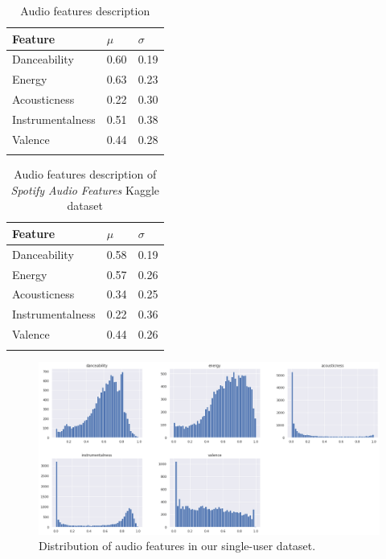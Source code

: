 \documentclass[sn-mathphys]{sn-jnl}%
\theoremstyle{thmstyleone}%
\theoremstyle{thmstyletwo}%
\theoremstyle{thmstylethree}%
\begin{document}
\begin{table}[h!]
      \begin{center}
      \begin{minipage}{\textwidth}
      \caption{Audio features description}\label{table:audio-features-stats}%
      \begin{tabular}{@{}lll@{}}
      \toprule
      Feature           & $\mu$ & $\sigma$ \\
      \midrule
      Danceability      & 0.60  & 0.19  \\
      Energy            & 0.63  & 0.23  \\
      Acousticness      & 0.22  & 0.30  \\
      Instrumentalness  & 0.51  & 0.38  \\
      Valence           & 0.44  & 0.28  \\
      \botrule
      \end{tabular}
      \end{minipage}
      \end{center}
\end{table}
\begin{table}[h!]
      \begin{center}
      \begin{minipage}{\textwidth}
      \caption{Audio features description of \emph{Spotify Audio Features} Kaggle dataset}\label{table:audio-features-stats-kaggle}%
      \begin{tabular}{@{}lll@{}}
      \toprule
      Feature           & $\mu$ & $\sigma$ \\
      \midrule
      Danceability      & 0.58   & 0.19  \\
      Energy            & 0.57  & 0.26  \\
      Acousticness      & 0.34  & 0.25  \\
      Instrumentalness  & 0.22  & 0.36  \\
      Valence           & 0.44  & 0.26  \\
      \botrule
      \end{tabular}
      \end{minipage}
      \end{center}
\end{table}

\begin{figure}[h!]
      \centering
      \includegraphics[width=\textwidth]{images/features-distribution.png}
      \caption{Distribution of audio features in our single-user dataset.}
      \label{fig:audio-features-distribution}
\end{figure}
\end{document}

